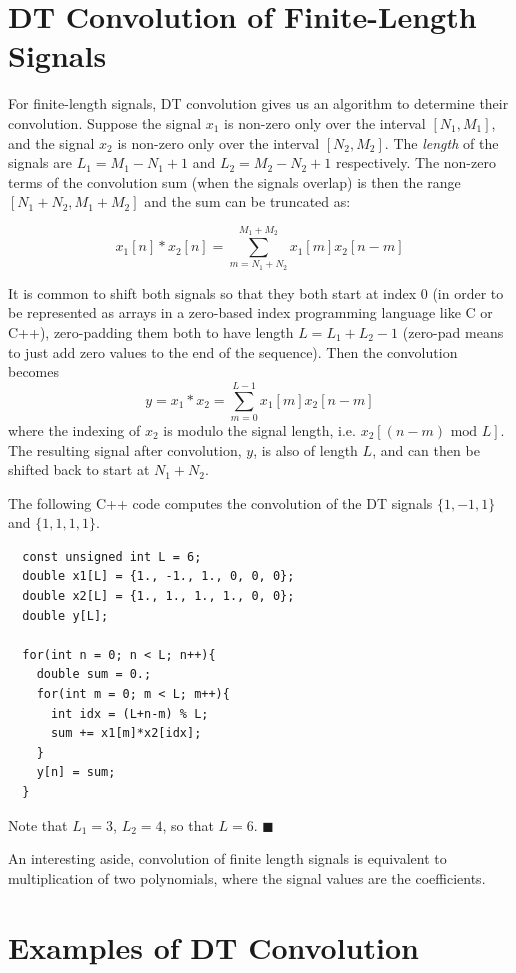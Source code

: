 \section{DT Convolution of Finite-Length Signals}

For finite-length signals, DT convolution gives us an algorithm to determine their convolution. Suppose the signal $x_1$ is non-zero only over the interval $[N_1,M_1]$, and the signal $x_2$ is non-zero only over the interval $[N_2,M_2]$. The \emph{length} of the signals are $L_1 = M_1-N_1+1$ and $L_2 = M_2-N_2+1$ respectively. The non-zero terms of the convolution sum (when the signals overlap) is then the range $[N_1+N_2,M_1+M_2]$ and the sum can be truncated as:

\[
x_1[n] * x_2[n] = \sum\limits_{m = N_1+N_2}^{M_1+M_2} x_1[m]x_2[n-m]
\]

It is common to shift both signals so that they both start at index $0$ (in order to be represented as arrays in a zero-based index programming language like C or C++), zero-padding them both to have length $L=L_1+L_2-1$ (zero-pad means to just add zero values to the end of the sequence). Then the convolution becomes
\[
y = x_1 * x_2 = \sum\limits_{m = 0}^{L-1} x_1[m]x_2[n-m]
\]
where the indexing of $x_2$ is modulo the signal length, i.e. $x_2[(n-m) \mbox{ mod } L]$. The resulting signal after convolution, $y$, is also of length $L$, and can then be shifted back to start at $N_1+N_2$.

\begin{example} The following C++ code computes the convolution of the DT signals $\{1,-1,1\}$ and $\{1,1,1,1\}$.
\begin{verbatim}
  const unsigned int L = 6;
  double x1[L] = {1., -1., 1., 0, 0, 0};
  double x2[L] = {1., 1., 1., 1., 0, 0};
  double y[L];

  for(int n = 0; n < L; n++){
    double sum = 0.;
    for(int m = 0; m < L; m++){
      int idx = (L+n-m) % L;
      sum += x1[m]*x2[idx];
    }
    y[n] = sum;
  }
\end{verbatim}
Note that $L_1 = 3$, $L_2 = 4$, so that $L=6$.
$\blacksquare$
\end{example}

An interesting aside, convolution of finite length signals is equivalent to multiplication of two polynomials, where the signal values are the coefficients.

\section{Examples of DT Convolution}

